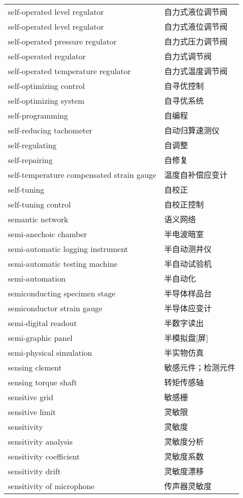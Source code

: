 \documentclass[
]{article}
\begin{document}
\begin{longtable}[]{@{}ll@{}}
self-operated level regulator & 自力式液位调节阀 \\
self-operated level regulator & 自力式液位调节阀 \\
self-operated pressure regulator & 自力式压力调节阀 \\
self-operated regulator & 自力式调节阀 \\
self-operated temperature regulator & 自力式温度调节阀 \\
self-optimizing control & 自寻优控制 \\
self-optimizing system & 自寻优系统 \\
self-programming & 自编程 \\
self-reducing tachometer & 自动归算速测仪 \\
self-regulating & 自调整 \\
self-repairing & 自修复 \\
self-temperature compensated strain gauge & 温度自补偿应变计 \\
self-tuning & 自校正 \\
self-tuning control & 自校正控制 \\
semantic network & 语义网络 \\
semi-anechoic chamber & 半电波暗室 \\
semi-automatic logging instrument & 半自动测井仪 \\
semi-automatic testing machine & 半自动试验机 \\
semi-automation & 半自动化 \\
semiconducting specimen stage & 半导体样品台 \\
semiconductor strain gauge & 半导体应变计 \\
semi-digital readout & 半数字读出 \\
semi-graphic panel & 半模拟盘{[}屏{]} \\
semi-physical simulation & 半实物仿真 \\
sensing clement & 敏感元件；检测元件 \\
sensing torque shaft & 转矩传感轴 \\
sensitive grid & 敏感栅 \\
sensitive limit & 灵敏限 \\
sensitivity & 灵敏度 \\
sensitivity analysis & 灵敏度分析 \\
sensitivity coefficient & 灵敏度系数 \\
sensitivity drift & 灵敏度漂移 \\
sensitivity of microphone & 传声器灵敏度 \\

\end{longtable}
\end{document}

